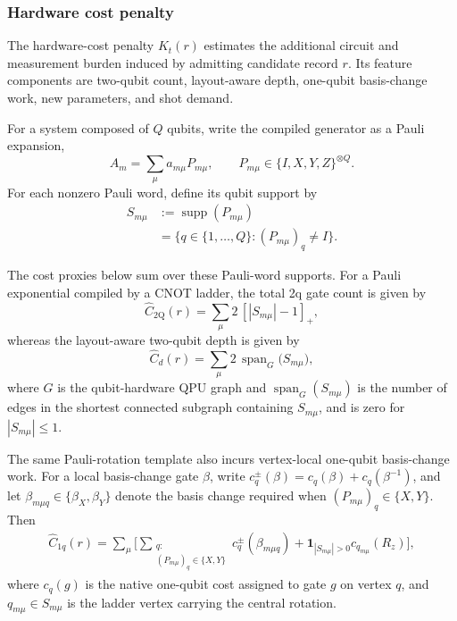 \documentclass[
  reprint,
  amsmath,
  amssymb,
  aps,
  pra,
  nofootinbib,
  superscriptaddress,
  floatfix
]{revtex4-2}
\newcommand{\twq}{\mathrm{2Q}}
\begin{document}
\subsubsection{Hardware cost penalty}

The hardware-cost penalty \(K_t(r)\) estimates the additional circuit and measurement burden induced by admitting candidate record \(r\). Its feature components are two-qubit count, layout-aware depth, one-qubit basis-change work, new parameters, and shot demand.

For a system composed of $Q$ qubits, write the compiled generator as a Pauli expansion, $$A_m=\sum_{\mu}a_{m\mu}P_{m\mu}, \qquad P_{m\mu}\in\{I,X,Y,Z\}^{\otimes Q}.$$ For each nonzero Pauli word, define its qubit support by
\begin{equation}
\begin{aligned}
S_{m\mu}
&:=\operatorname{supp}(P_{m\mu}) \\
&=\{q\in\{1,\ldots,Q\}:(P_{m\mu})_q\ne I\}.
\end{aligned}
\label{eq:pauli_word_support}
\end{equation}

The cost proxies below sum over these Pauli-word supports. For a Pauli exponential compiled by a CNOT ladder, the total 2q gate count is given by
\begin{equation}
\widehat C_{\twq}(r)=\sum_{\mu}2\,[|S_{m\mu}|-1]_+,
\label{eq:pauli_2count_proxy}
\end{equation}
whereas the layout-aware two-qubit depth is given by
\begin{equation}
\widehat C_d(r)=\sum_{\mu}2\,\operatorname{span}_{G}
\bigl(S_{m\mu}\bigr),
\label{eq:pauli_2depth_proxy}
\end{equation}
where $G$ is the qubit-hardware QPU graph and $\operatorname{span}_{G}(S_{m \mu})$ is the number of edges in the shortest connected subgraph containing $S_{m \mu}$, and is zero for $|S_{m \mu}|\le1$.

The same Pauli-rotation template also incurs vertex-local one-qubit basis-change work. For a local basis-change gate $\beta$, write \(c_q^{\pm}(\beta)=c_q(\beta)+c_q(\beta^{-1})\), and let \(\beta_{m\mu q}\in\{\beta_X,\beta_Y\}\) denote the basis change required when \((P_{m\mu})_q\in\{X,Y\}\). Then
\begin{equation}
\begin{aligned}
\widehat C_{1q}(r)
=
\sum_{\mu}
\Bigg[
\sum_{\substack{q:\\(P_{m\mu})_q\in\{X,Y\}}}
c_q^{\pm}(\beta_{m\mu q})
+
\mathbf 1_{|S_{m\mu}|>0}c_{q_{m\mu}}(R_z)
\Bigg],
\end{aligned}
\label{eq:pauli_1count_proxy}
\end{equation}
where $c_q(g)$ is the native one-qubit cost assigned to gate $g$ on vertex $q$, and $q_{m\mu}\in S_{m\mu}$ is the ladder vertex carrying the central rotation.
\end{document}
